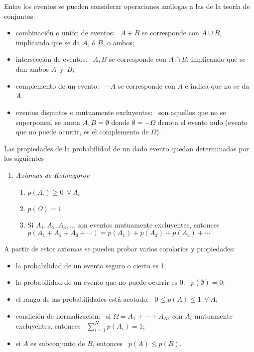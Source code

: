 Entre  los eventos  se  pueden considerar  operaciones  an\'alogas a  las de  la
teor\'ia de conjuntos:
\begin{itemize}
\item combinaci\'on o uni\'on de eventos:  \ $A+B$ se corresponde con $A\cup B$,
  implicando que se da $A$, \'o $B$, o ambos;
%
\item  intersecci\'on  de  eventos:  \  $A,B$  se  corresponde  con  $A\cap  B$,
  implicando que se dan ambos $A$~y~$B$;
%
\item complemento  de un evento: \ $-A$  se corresponde con $\tilde  A$ e indica
  que no se da $A$.
%
\item  eventos disjuntos  o mutuamente  excluyentes: \  son aquellos  que  no se
  superponen,  se anota $A,B  = \emptyset$  donde $\emptyset=-\Omega$  denota el
  evento nulo (evento que no puede ocurrir, es el complemento de $\Omega$).
\end{itemize}

Las propiedades de la probabilidad de un dado evento quedan determinadas por los
siguientes

\begin{enumerate}
\item[]\emph{Axiomas de Kolmogorov}
%
  \begin{enumerate}
  \item $p(A_i) \geq 0 \ \ \forall \ A_i$
  \item $p(\Omega) = 1$
  \item Si $A_1, A_2, A_3,  \ldots$ son eventos mutuamente excluyentes, entonces
    $p(A_1+A_2+A_3+\cdots)=p(A_1)+p(A_2)+p(A_3)+\cdots$
  \end{enumerate}
\end{enumerate}

A partir de estos axiomas se pueden probar varios corolarios y propiedades:
%
\begin{itemize}
\item la probabilidad de un evento seguro o cierto es 1;
%
\item  la   probabilidad  de   un  evento   que  no  puede   ocurrir  es   0:  \
  $p(\emptyset)=0$;
%
\item el  rango de  las probabilidades  est\'a acotado: \  $0\leq p(A)\leq  1\ \
  \forall \ A$;
%
\item condici\'on  de normalizaci\'on:  \ si $\Omega=A_1+\cdots+A_N$,  con $A_i$
  mutuamente excluyentes, entonces \ $\sum_{i=1}^N p(A_i)=1$;
%
\item si $A$ es subconjunto de $B$, entonces \ $p(A)\leq p(B)$.
\end{itemize}

